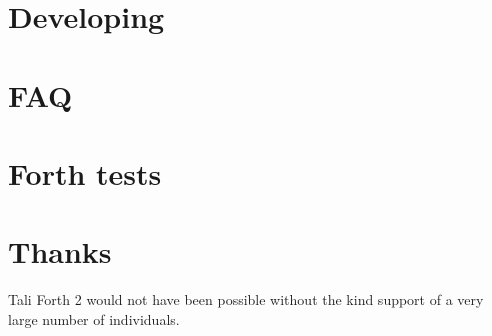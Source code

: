 \documentclass[a4paper,notitlepage]{report}
\begin{document}
\chapter{Developing}
        




\appendix

\chapter{FAQ}
        

\chapter{Forth tests}
        

\chapter{Thanks}
Tali Forth 2 would not have been possible without the kind support of a very
large number of individuals.

\begin{theindex}
\end{theindex}
\end{document}
